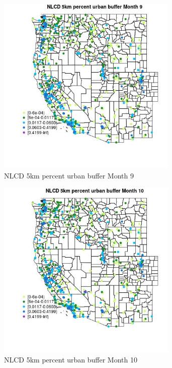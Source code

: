 \begin{figure} 
\centering  
\includegraphics[width=0.77\textwidth]{Code_Outputs/Report_ML_input_PM25_Step4_part_e_de_duplicated_aves_compiled_2019-05-14wNAs_MapObsMo9NLCD_5km_percent_urban_buffer.jpg} 
\caption{\label{fig:Report_ML_input_PM25_Step4_part_e_de_duplicated_aves_compiled_2019-05-14wNAsMapObsMo9NLCD_5km_percent_urban_buffer}NLCD 5km percent urban buffer Month 9} 
\end{figure} 
 

\clearpage 

\begin{figure} 
\centering  
\includegraphics[width=0.77\textwidth]{Code_Outputs/Report_ML_input_PM25_Step4_part_e_de_duplicated_aves_compiled_2019-05-14wNAs_MapObsMo10NLCD_5km_percent_urban_buffer.jpg} 
\caption{\label{fig:Report_ML_input_PM25_Step4_part_e_de_duplicated_aves_compiled_2019-05-14wNAsMapObsMo10NLCD_5km_percent_urban_buffer}NLCD 5km percent urban buffer Month 10} 
\end{figure} 
 

